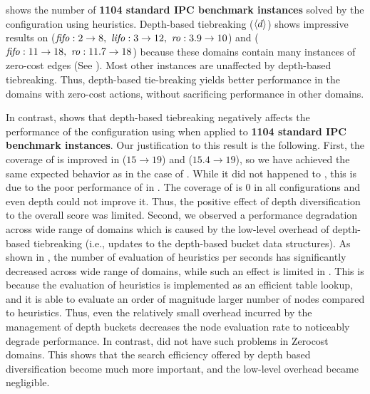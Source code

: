  shows the number of \textbf{1104 standard IPC benchmark instances} solved by the configuration using \lmcut
heuristics. Depth-based tiebreaking (${\left<d\right>}$) shows impressive results on  ($\fifo:2\to 8,\ \lifo:3\to 12,\  \ro:3.9\to 10$) and  (${\text{\textit{fifo}}}: 11\to 18,\ {\text{\textit{ro}}}: 11.7\to 18$) because these
domains contain many instances of zero-cost edges (See
).  Most other instances are unaffected by depth-based tiebreaking.  Thus, depth-based
tie-breaking yields better performance in the domains with zero-cost actions, without sacrificing performance in
other domains.

In contrast,  shows that depth-based tiebreaking negatively affects the performance of
the configuration using \mands when applied to \textbf{1104 standard IPC benchmark instances}. Our justification to this result is
the following.
% 
First, the coverage of  is improved in \fifo ($15\to 19$) and \ro ($15.4\to 19$), so we have achieved the same expected behavior as in the case of \lmcut.
%
While it did not happened to , this is due to the poor performance of \mands in .
The coverage of  is 0 in all configurations and even depth could not improve it. Thus, the positive
effect of depth diversification to the overall score was limited.
% 
Second, we observed a performance degradation across wide range of domains which is caused by the low-level overhead of depth-based tiebreaking (i.e., updates to the depth-based bucket data structures).
As shown in , the number of evaluation of \mands heuristics per seconds has significantly decreased across wide range of domains, while such an effect is limited in \lmcut.
This is because the evaluation of \mands heuristics is implemented
as an efficient table lookup, and it is able to evaluate an order of magnitude larger number of nodes compared to \lmcut heuristics.
Thus, even the relatively small overhead incurred by the management of depth buckets decreases the node evaluation rate to noticeably degrade performance.
In contrast, \mands did not have such problems in Zerocost domains. This shows that the search efficiency offered by depth based diversification become much more important,
and the low-level overhead became negligible.


